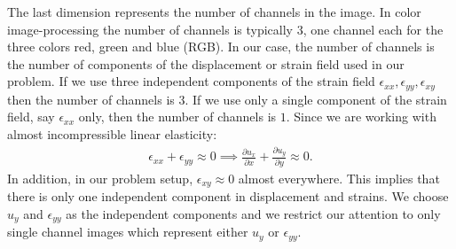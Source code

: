 \documentclass[12pt]{article}
\newcommand{\pdd}[2]{\frac{\partial{{#1}}}{\partial{#2}}}
\begin{document}
The last dimension represents the number of channels in the image. In color image-processing the number of channels is typically $3$, one channel each for the three colors red, green and blue (RGB). In our case, the number of channels is the number of components of the displacement or strain field used in our problem. If we use three independent components of the strain field $\epsilon_{xx},\epsilon_{yy},\epsilon_{xy}$ then the number of channels is $3$. If we use only a single component of the strain field, say $\epsilon_{xx}$ only, then the number of channels is $1$.
Since we are working with almost incompressible linear elasticity:
\begin{align}
  \epsilon_{xx}+\epsilon_{yy}\approx{0} \implies \pdd{u_x}{x} + \pdd{u_y}{y} \approx{0}.
\end{align}
In addition, in our problem setup, $\epsilon_{xy}\approx{0}$ almost everywhere. This implies that there is only one independent component in displacement and strains. We choose $u_y$ and $\epsilon_{yy}$ as the independent components and we restrict our attention to only single channel images which represent either $u_y$ or $\epsilon_{yy}$.
\end{document}

